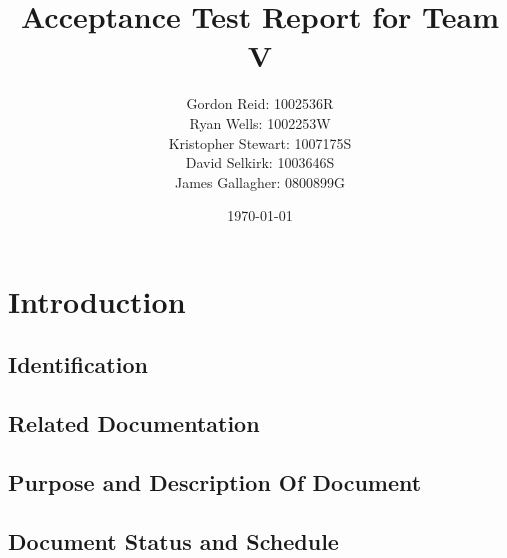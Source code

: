 \documentclass[11pt]{l3deliverable}
\title{Acceptance Test Report for Team V}
\author{
    Gordon Reid: 1002536R\\
    Ryan Wells: 1002253W\\
    Kristopher Stewart: 1007175S\\
    David Selkirk: 1003646S\\
    James Gallagher: 0800899G\\
}
\date{\today}
\begin{document}
\maketitle

\newpage

\tableofcontents

\newpage

\section{Introduction}

\subsection{Identification}

\subsection{Related Documentation}

\subsection{Purpose and Description Of Document}

\subsection{Document Status and Schedule}

\newpage
\end{document}
